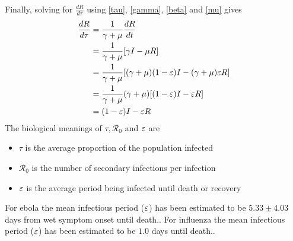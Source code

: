 Finally, solving for $\frac{dR}{d\tau}$ using \ref{tau}, \ref{gamma}, \ref{beta} and \ref{mu} gives
\begin{align*}
    \frac{dR}{d\tau} &= \frac{1}{\gamma+\mu}\frac{dR}{dt}\nonumber\\
     &= \frac{1}{\gamma+\mu}[\gamma I - \mu R]\nonumber\\
     &= \frac{1}{\gamma+\mu}[(\gamma+\mu)(1-\varepsilon)I - (\gamma+\mu)\varepsilon R]\nonumber\\
     &= \frac{1}{\gamma+\mu}(\gamma+\mu)[(1-\varepsilon)I - \varepsilon R]\nonumber\\
     &= (1-\varepsilon)I - \varepsilon R
\end{align*}
The biological meanings of $\tau, {\mathcal R_0}$ and $\varepsilon$ are
\begin{itemize}
    \item $\tau$ is the average proportion of the population infected
    \item ${\mathcal R_0}$ is the number of secondary infections per infection
    \item $\varepsilon$ is the average period being infected until death or recovery
\end{itemize}
For ebola the mean infectious period ($\varepsilon$) has been estimated to be $5.33\pm 4.03$ days from wet symptom onset until death.\cite{ebola}.
For influenza the mean infectious period ($\varepsilon$) has been estimated to be $1.0$ days until death.\cite{flu}.
